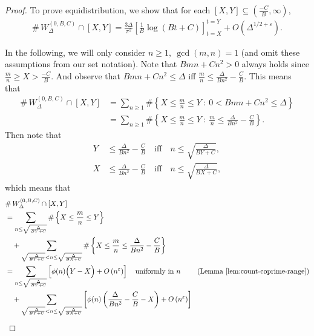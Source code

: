 \documentclass[11pt,letterpaper,reqno]{amsart}
\numberwithin{equation}{section}
\numberwithin{figure}{section}
\numberwithin{table}{section}
\newcommand{\lrp}[1]{\left(#1\right)}
\newcommand{\lrb}[1]{\left[#1\right]}
\newcommand{\lrcb}[1]{\left\{#1\right\}}
\begin{document}
\begin{proof}
    To prove equidistribution, we show that for each $[X,Y] \subseteq (\frac{-C}{B},\infty)$,
    \begin{align} \label{eqn:goal-equid-A=0,B>0} \tag{$*$}
        \#\, W_{\Delta}^{(0,B,C)} \cap [X,Y] = 
        \frac{3\Delta}{\pi^2} \lrb{ 
        \frac1B \log(Bt+C) 
        }_{t=X}^{t=Y} + O\lrp{\Delta^{1/2+\varepsilon}}.
    \end{align}

    In the following, we will only consider $n \ge 1,~ \gcd(m,n)=1$ (and omit these assumptions from our set notation). Note that $B mn + C n^2 > 0$ always holds since $\frac mn \ge X > \frac{-C}{B}$. And observe that $B mn + C n^2 \le \Delta$ iff $\frac mn \le \frac{\Delta}{Bn^2}-\frac{C}{B}$. This means that
    \begin{align} 
        \#\, W_{\Delta}^{(0,B,C)} \cap [X,Y] 
        &= \sum_{n \ge 1} \#\lrcb{ X \le \frac{m}{n} \le Y ~:~  0 < B mn + C n^2 \le \Delta} \\
        &= \sum_{n \ge 1} \#\lrcb{ X \le \frac{m}{n} \le Y ~:~ \frac{m}{n} \le  \frac{\Delta}{Bn^2}-\frac{C}{B}}.
    \end{align}
    Then note that 
    \begin{align}
        Y &\le  \frac{\Delta}{Bn^2}-\frac{C}{B} \quad\text{iff}\quad n \le \sqrt{\frac{\Delta}{BY+C}}, \\
        X &\le  \frac{\Delta}{Bn^2}-\frac{C}{B} \quad\text{iff}\quad n \le \sqrt{\frac{\Delta}{BX+C}},
    \end{align}
    which means that
    \begin{align} 
        &\#\, W_{\Delta}^{(0,B,C)} \cap [X,Y]  \\
        &=
        \sum_{n \le \sqrt{\frac{\Delta}{BY+C}}} \#\lrcb{ X \le \frac{m}{n} \le Y }  \\
        &\quad+
        \sum_{\sqrt{\frac{\Delta}{BY+C}} < n \le \sqrt{\frac{\Delta}{BX+C}}} \#\lrcb{ X \le \frac{m}{n} \le   \frac{\Delta}{Bn^2}-\frac{C}{B} } \\
        &= \sum_{n \le \sqrt{\frac{\Delta}{BY+C}}} \lrb{\phi(n) \Big(Y-X\Big) + O\lrp{n^{\varepsilon}}} 
        \quad \text{uniformly in $n$ \qquad (Lemma \ref{lem:count-coprime-range})} \\
        &\quad+
        \sum_{\sqrt{\frac{\Delta}{BY+C}} < n \le \sqrt{\frac{\Delta}{BX+C}}}  \lrb{\phi(n) \lrp{
            \frac{\Delta}{Bn^2} - \frac{C}{B} - X} + O\lrp{n^{\varepsilon}} 
}
\end{align}
\end{proof}
\end{document}
